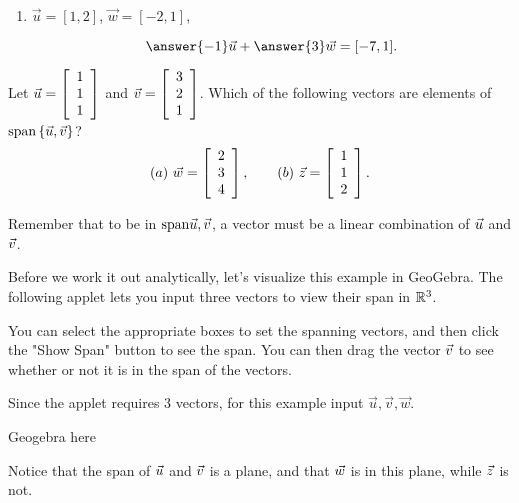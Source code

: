 \documentclass{ximera}
\begin{document}
\begin{exploration}
\begin{example}
\begin{enumerate}
    \item $\vec{u}=[1,2]$, $\vec{w}=[-2,1]$,
    
    $$\answer{-1}\vec{u}+\answer{3}\vec{w}=[-7,1].$$

  \end{enumerate}

\end{example}

\begin{example}
  Let $\vect{u}=\startmat{r} 1 \\ 1 \\ 1 \stopmat$ and
  $\vect{v}=\startmat{r} 3 \\ 2 \\ 1 \stopmat$. Which
  of the following vectors are elements of
  $\sspan\set{\vect{u},\vect{v}}$?
  \begin{equation*}
    (a)\quad\vect{w} = \startmat{r} 2 \\ 3 \\ 4 \stopmat,
    \qquad
    (b)\quad\vect{z} = \startmat{r} 1 \\ 1 \\ 2 \stopmat.
  \end{equation*}

  \begin{hint}
  
    Remember that to be in $\sspan{\vect{u},\vect{v}}$, a vector must be a linear combination of $\vect{u}$ and $\vect{v}$.

  \end{hint}

  \begin{solution}

  Before we work it out analytically, let's visualize this example in GeoGebra. The following applet lets you input three vectors to view their span in $\R^3$.

  You can select the appropriate boxes to set the spanning vectors, and then click the "Show Span" button to see the span. You can then drag the vector $\vect{v}$ to see whether or not it is in the span of the vectors.

  Since the applet requires 3 vectors, for this example input $\vec{u}, \vec{v}, \vec{w}$. 

  \begin{center}
    Geogebra here
  \end{center}

  Notice that the span of $\vect{u}$ and $\vect{v}$ is a plane, and that $\vect{w}$ is in this plane, while $\vect{z}$ is not.


\end{solution}
\end{example}
\end{exploration}
\end{document}
